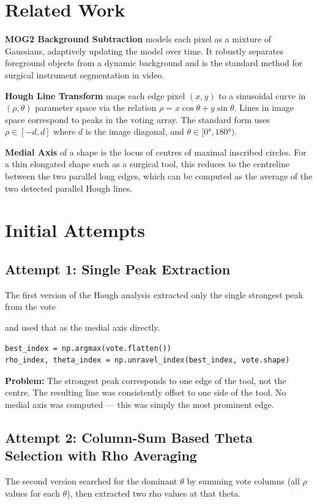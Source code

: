 \documentclass[journal]{IEEEtran}
\begin{document}
\section{Related Work}
\textbf{MOG2 Background Subtraction} models each pixel as 
a mixture of Gaussians, adaptively updating the model over time. It robustly 
separates foreground objects from a dynamic background and is the standard method 
for surgical instrument segmentation in video.

\textbf{Hough Line Transform} maps each edge pixel 
$(x, y)$ to a sinusoidal curve in $(\rho, \theta)$ parameter space via the 
relation $\rho = x\cos\theta + y\sin\theta$. Lines in image space correspond 
to peaks in the voting array. The standard form uses $\rho \in [-d, d]$ where 
$d$ is the image diagonal, and $\theta \in [0°, 180°)$.

\textbf{Medial Axis} of a shape is the locus of centres of 
maximal inscribed circles. For a thin elongated shape such as a surgical tool, 
this reduces to the centreline between the two parallel long edges, which can 
be computed as the average of the two detected parallel Hough lines.

\section{Initial Attempts}

\subsection{Attempt 1: Single Peak Extraction}
The first version of the Hough analysis extracted only the single strongest 
peak from the vote

and used that as the medial axis directly.

\begin{lstlisting}
best_index = np.argmax(vote.flatten())
rho_index, theta_index = np.unravel_index(best_index, vote.shape)
\end{lstlisting}

\textbf{Problem:} The strongest peak corresponds to one edge of the tool, 
not the centre. The resulting line was consistently offset to one side of 
the tool. No medial axis was computed — this was simply the most prominent edge.

\subsection{Attempt 2: Column-Sum Based Theta Selection with Rho Averaging}
The second version searched for the dominant $\theta$ by summing vote 
columns (all $\rho$ values for each $\theta$), then extracted two rho values 
at that theta.
\end{document}
